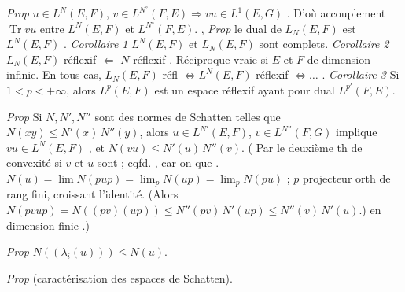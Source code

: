 \documentclass[11pt,a4paper]{article}
\begin{document}
\emph{Prop} $u \in L^N(E,F)$, $v \in L^{N^{\circ}}(F,E) \Longrightarrow vu \in L^1(E,G)$ . D'où accouplement $\operatorname{Tr} vu$ entre $L^N(E,F)$ et $L^{N^{\circ}}(F,E)$. ,  \ill{}  \emph{Prop} le dual de $L_N(E,F)$ est $L^{N}(E,F)$ . \emph{Corollaire 1} $L^N(E,F)$ et $L_N(E,F)$ sont complets. \emph{Corollaire 2} $L_N(E,F)$ réflexif $\Longleftarrow$ $N$ réflexif . Réciproque vraie si $E$ et $F$ de dimension infinie. En tous cas, $L_N(E,F)$ réfl $\iff L^N(E,F)$ réflexif $\iff \ldots$ . \emph{Corollaire 3} Si $1 < p < +\infty$, alors $L^p(E,F)$ est un espace réflexif ayant pour dual $L^{p'}(F,E)$.

\emph{Prop} Si $N, N', N''$ sont des normes de Schatten telles que $N(xy) \leq N'(x)\,N''(y)$, alors $u \in L^{N'}(E,F)$, $v \in L^{N''}(F,G)$ implique $vu \in L^N(E,F)$ , et $N(vu) \leq N'(u)\,N''(v)$.  (  Par le deuxième th de convexité si $v$ et $u$ sont  ; \struck{\ill{}}   cqfd. , car on  que . $N(u) = \lim N(pup) = \lim_p N(up) = \lim_p N(pu)$ ; $p$ projecteur orth de rang fini, croissant  l'identité. (Alors $N(pvup) = N((pv)(up)) \leq N''(pv)\,N'(up) \leq N''(v)\,N'(u)$.) \ill{} en dimension finie \ill{}.)

\emph{Prop} $N((\lambda_i(u))) \leq N(u)$.

\emph{Prop} (caractérisation des espaces de Schatten).
\end{document}
